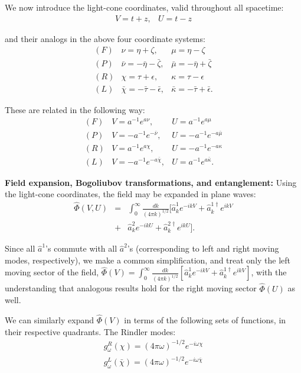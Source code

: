 \documentclass[aps,prl,twocolumn,showpacs]{revtex4}
\begin{document}
We now introduce the light-cone coordinates, valid throughout all spacetime:
\begin{eqnarray*}
V = t + z, & U = t - z
\end{eqnarray*}

and their analogs in the above four coordinate systems:
\begin{eqnarray*}
(F) & \nu = \eta + \zeta, & \mu = \eta - \zeta \\
(P) & \bar{\nu} = -\bar{\eta} - \bar{\zeta}, & \bar{\mu} = - \bar{\eta} + \bar{\zeta} \\
(R) & \chi = \tau + \epsilon, & \kappa = \tau - \epsilon \\
(L) & \bar{\chi} = - \bar{\tau} - \bar{\epsilon}, & \bar{\kappa} = - \bar{\tau} + \bar{\epsilon}.
\end{eqnarray*}

These are related in the following way:
\begin{eqnarray*}
(F) & V = a^{-1} e^{a \nu}, & U = a^{-1} e^{a \mu} \\
(P) & V = - a^{-1} e^{- \bar{\nu}}, & U = - a^{-1} e^{-a \bar{\mu}} \\
(R) & V = a^{-1} e^{a \chi}, & U = -a^{-1} e^{-a \kappa} \\
(L) & V = - a^{-1} e^{- a \bar{\chi}}, & U = a^{-1} e^{a \bar{\kappa}}.
\end{eqnarray*}

\textbf{Field expansion, Bogoliubov transformations, and entanglement:}  Using the light-cone coordinates, the field may be expanded in plane waves:
\begin{eqnarray*}
\hat{\Phi}(V, U) &=& \int_{0}^{\infty} \frac{dk}{ (4 \pi k)^{1/2}}  [ \hat{a}^{1}_{k} e^{-ikV} + \hat{a}^{1 \dagger}_{k} e^{ikV} \\
 &+& \hat{a}^{2}_{k} e^{-ikU} + \hat{a}^{2 \dagger}_{k} e^{ikU}  ].
\end{eqnarray*}

Since all $\hat{a}^{1}$'s commute with all $\hat{a}^{2}$'s (corresponding to left and right moving modes, respectively), we make a common simplification, and treat only the left moving sector of the field, $\hat{\Phi}(V) = \int_{0}^{\infty} \frac{dk}{ (4 \pi k)^{1/2}}  [ \hat{a}^{1}_{k} e^{-ikV} + \hat{a}^{1 \dagger}_{k} e^{ikV}]$, with the understanding that analogous results hold for the right moving sector $\hat{\Phi}(U)$ as well.

We can similarly expand $\hat{\Phi}(V)$ in terms of the following sets of functions, in their respective quadrants.  The Rindler modes:
\begin{eqnarray*}
g_{\omega}^{R}(\chi) = (4 \pi \omega)^{-1/2} e^{-i \omega  \chi} \\
g_{\omega}^{L}(\bar{\chi}) = (4 \pi \omega)^{-1/2} e^{-i \omega \bar{\chi}}
\end{eqnarray*}
\end{document}
